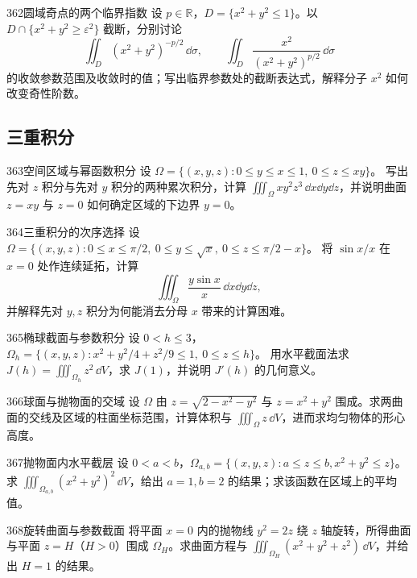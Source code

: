 \begin{exercise}{362}{圆域奇点的两个临界指数}
设 $p\in\mathbb R$，$D=\{x^2+y^2\leq1\}$。以 $D\cap\{x^2+y^2\geq\varepsilon^2\}$ 截断，分别讨论
\[
 \iint_D(x^2+y^2)^{-p/2}\,\dd\sigma,\qquad
 \iint_D\frac{x^2}{(x^2+y^2)^{p/2}}\,\dd\sigma
\]
的收敛参数范围及收敛时的值；写出临界参数处的截断表达式，解释分子 $x^2$ 如何改变奇性阶数。
\end{exercise}

\subsection{三重积分}

\begin{exercise}{363}{空间区域与幂函数积分}
设 $\Omega=\{(x,y,z):0\leq y\leq x\leq1,\ 0\leq z\leq xy\}$。
写出先对 $z$ 积分与先对 $y$ 积分的两种累次积分，计算
$\iiint_\Omega xy^2z^3\,\dd x\dd y\dd z$，并说明曲面 $z=xy$ 与 $z=0$ 如何确定区域的下边界 $y=0$。
\end{exercise}

\begin{exercise}{364}{三重积分的次序选择}
设 $\Omega=\{(x,y,z):0\leq x\leq\pi/2,\ 0\leq y\leq\sqrt{x},\ 0\leq z\leq\pi/2-x\}$。
将 $\sin x/x$ 在 $x=0$ 处作连续延拓，计算
\[
 \iiint_\Omega\frac{y\sin x}{x}\,\dd x\dd y\dd z,
\]
并解释先对 $y,z$ 积分为何能消去分母 $x$ 带来的计算困难。
\end{exercise}

\begin{exercise}{365}{椭球截面与参数积分}
设 $0<h\leq3$，$\Omega_h=\{(x,y,z):x^2+y^2/4+z^2/9\leq1,\ 0\leq z\leq h\}$。
用水平截面法求 $J(h)=\iiint_{\Omega_h}z^2\,\dd V$，求 $J(1)$，并说明 $J'(h)$ 的几何意义。
\end{exercise}

\begin{exercise}{366}{球面与抛物面的交域}
设 $\Omega$ 由 $z=\sqrt{2-x^2-y^2}$ 与 $z=x^2+y^2$ 围成。求两曲面的交线及区域的柱面坐标范围，计算体积与 $\iiint_\Omega z\,\dd V$，进而求均匀物体的形心高度。
\end{exercise}

\begin{exercise}{367}{抛物面内水平截层}
设 $0<a<b$，$\Omega_{a,b}=\{(x,y,z):a\leq z\leq b,x^2+y^2\leq z\}$。求 $\iiint_{\Omega_{a,b}}(x^2+y^2)^2\,\dd V$，给出 $a=1,b=2$ 的结果；求该函数在区域上的平均值。
\end{exercise}

\begin{exercise}{368}{旋转曲面与参数截面}
将平面 $x=0$ 内的抛物线 $y^2=2z$ 绕 $z$ 轴旋转，所得曲面与平面 $z=H$（$H>0$）围成 $\Omega_H$。求曲面方程与 $\iiint_{\Omega_H}(x^2+y^2+z^2)\,\dd V$，并给出 $H=1$ 的结果。
\end{exercise}

